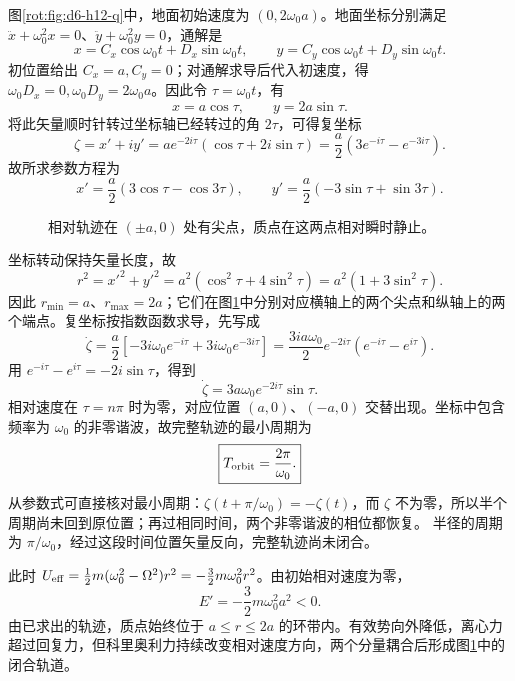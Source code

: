 \begin{solution}
图\ref{rot:fig:d6-h12-q}中，地面初始速度为 $(0,2\omega_0a)$。地面坐标分别满足 $\ddot x+\omega_0^2x=0$、$\ddot y+\omega_0^2y=0$，通解是
\[
x=C_x\cos\omega_0t+D_x\sin\omega_0t,\qquad
y=C_y\cos\omega_0t+D_y\sin\omega_0t.
\]
初位置给出 $C_x=a,C_y=0$；对通解求导后代入初速度，得 $\omega_0D_x=0,\omega_0D_y=2\omega_0a$。因此令 $\tau=\omega_0t$，有
\[
x=a\cos\tau,\qquad y=2a\sin\tau.
\]
将此矢量顺时针转过坐标轴已经转过的角 $2\tau$，可得复坐标
\[
\zeta=x'+iy'=a e^{-2i\tau}(\cos\tau+2i\sin\tau)
=\frac a2(3e^{-i\tau}-e^{-3i\tau}).
\]
故所求参数方程为
\[
\boxed{x'=\frac a2(3\cos\tau-\cos3\tau),\qquad
y'=\frac a2(-3\sin\tau+\sin3\tau).}
\]
\begin{figure}[H]\centering
{}
\caption{相对轨迹在 $(\pm a,0)$ 处有尖点，质点在这两点相对瞬时静止。}\label{rot:fig:d6-h12-s}
\end{figure}
坐标转动保持矢量长度，故
\[
r^2=x'^2+y'^2=a^2(\cos^2\tau+4\sin^2\tau)
=a^2(1+3\sin^2\tau).
\]
因此 $r_{\min}=a$、$r_{\max}=2a$；它们在图\ref{rot:fig:d6-h12-s}中分别对应横轴上的两个尖点和纵轴上的两个端点。复坐标按指数函数求导，先写成
\[
\dot\zeta=\frac a2\left[-3i\omega_0e^{-i\tau}+3i\omega_0e^{-3i\tau}\right]
=\frac{3ia\omega_0}{2}e^{-2i\tau}(e^{-i\tau}-e^{i\tau}).
\]
用 $e^{-i\tau}-e^{i\tau}=-2i\sin\tau$，得到
\[
\dot\zeta=3a\omega_0e^{-2i\tau}\sin\tau.
\]
相对速度在 $\tau=n\pi$ 时为零，对应位置 $(a,0)$、$(-a,0)$ 交替出现。坐标中包含频率为 $\omega_0$ 的非零谐波，故完整轨迹的最小周期为
\[
\boxed{T_{\rm orbit}=\frac{2\pi}{\omega_0}.}
\]
从参数式可直接核对最小周期：$\zeta(t+\pi/\omega_0)=-\zeta(t)$，而 $\zeta$ 不为零，所以半个周期尚未回到原位置；再过相同时间，两个非零谐波的相位都恢复。
半径的周期为 $\pi/\omega_0$，经过这段时间位置矢量反向，完整轨迹尚未闭合。

此时 $U_{\rm eff}=\frac12m(\omega_0^2-\Omega^2)r^2=-\frac32m\omega_0^2r^2$。由初始相对速度为零，
\[
E'=-\frac32m\omega_0^2a^2<0.
\]
由已求出的轨迹，质点始终位于 $a\le r\le2a$ 的环带内。有效势向外降低，离心力超过回复力，但科里奥利力持续改变相对速度方向，两个分量耦合后形成图\ref{rot:fig:d6-h12-s}中的闭合轨道。
\end{solution}

